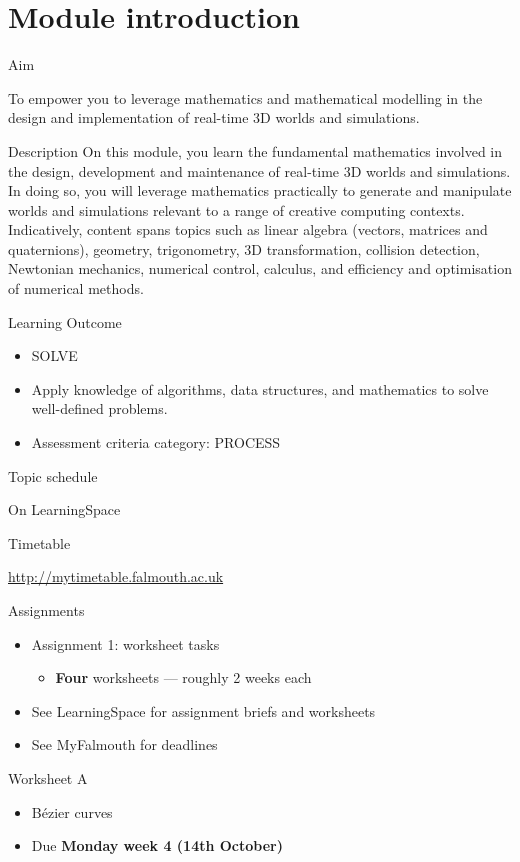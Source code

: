 \part{Module introduction}
\frame{\partpage}

\begin{frame}{Aim}
\begin{center}
To empower you to leverage mathematics and mathematical modelling in the design and implementation of real-time 3D worlds and simulations.
\end{center}
\end{frame}

\begin{frame}{Description}
On this module, you learn the fundamental mathematics involved in the design, development and maintenance of real-time 3D worlds and simulations. In doing so, you will leverage mathematics practically to generate and manipulate worlds and simulations relevant to a range of creative computing contexts. Indicatively, content spans topics such as linear algebra (vectors, matrices and quaternions), geometry, trigonometry, 3D transformation, collision detection, Newtonian mechanics, numerical control, calculus, and efficiency and optimisation of numerical methods.
\end{frame}

\begin{frame}{Learning Outcome}
	\begin{itemize}
		\item SOLVE
		\item Apply knowledge of algorithms, data structures, and mathematics to solve well-defined problems.
		\item Assessment criteria category: PROCESS
	\end{itemize}
\end{frame}

\begin{frame}{Topic schedule}
	\begin{center}
		On LearningSpace
	\end{center}
\end{frame}

\begin{frame}{Timetable}
	\begin{center}
		\url{http://mytimetable.falmouth.ac.uk}
	\end{center}
\end{frame}

\begin{frame}{Assignments}
	\begin{itemize}
		\pause\item Assignment 1: worksheet tasks
			\begin{itemize}
				\pause\item \textbf{Four} worksheets --- roughly 2 weeks each
			\end{itemize}
		\pause\item See LearningSpace for assignment briefs and worksheets
		\pause\item See MyFalmouth for deadlines
	\end{itemize}
\end{frame}

\begin{frame}{Worksheet A}
	\begin{itemize}
		\item B\'ezier curves
		\item Due \textbf{Monday week 4 (14th October)}
	\end{itemize}
\end{frame}
